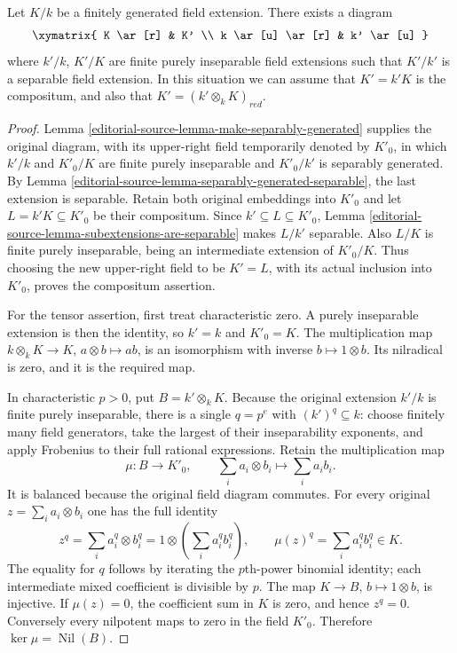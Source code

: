 \begin{lemma}
\label{editorial-source-lemma-make-separable}
Let $K/k$ be a finitely generated field extension.
There exists a diagram
$$
\xymatrix{
K \ar[r] & K' \\
k \ar[u] \ar[r] & k' \ar[u]
}
$$
where $k'/k$, $K'/K$ are finite purely inseparable field
extensions such that $K'/k'$ is a separable field extension.
In this situation we can assume that $K' = k'K$ is the compositum,
and also that $K' = (k' \otimes_k K)_{red}$.
\end{lemma}

\begin{proof}
Lemma \ref{editorial-source-lemma-make-separably-generated} supplies
the original diagram, with its upper-right field
temporarily denoted by $K'_0$, in which $k'/k$
and $K'_0/K$ are finite purely inseparable and
$K'_0/k'$ is separably generated. By Lemma
\ref{editorial-source-lemma-separably-generated-separable}, the last
extension is separable. Retain both original
embeddings into $K'_0$ and let $L=k'K\subseteq K'_0$
be their compositum. Since $k'\subseteq L\subseteq K'_0$,
Lemma \ref{editorial-source-lemma-subextensions-are-separable} makes
$L/k'$ separable. Also $L/K$ is finite purely
inseparable, being an intermediate extension of
$K'_0/K$. Thus choosing the new upper-right field
to be $K'=L$, with its actual inclusion into
$K'_0$, proves the compositum assertion.

For the tensor assertion, first treat characteristic
zero. A purely inseparable extension is then the
identity, so $k'=k$ and $K'_0=K$. The multiplication
map $k\otimes_k K\to K$, $a\otimes b\mapsto ab$,
is an isomorphism with inverse $b\mapsto1\otimes b$.
Its nilradical is zero, and it is the required map.

In characteristic $p>0$, put $B=k'\otimes_k K$.
Because the original extension $k'/k$ is finite
purely inseparable, there is a single $q=p^e$
with $(k')^q\subseteq k$: choose finitely many
field generators, take the largest of their
inseparability exponents, and apply Frobenius
to their full rational expressions. Retain
the multiplication map
$$
\mu:B\longrightarrow K'_0,\qquad
\sum_i a_i\otimes b_i\longmapsto\sum_i a_i b_i.
$$
It is balanced because the original field diagram
commutes. For every original $z=\sum_i a_i\otimes b_i$
one has the full identity
$$
z^q=\sum_i a_i^q\otimes b_i^q
=1\otimes\left(\sum_i a_i^q b_i^q\right),
\qquad
\mu(z)^q=\sum_i a_i^q b_i^q\in K.
$$
The equality for $q$ follows by iterating the
$p$th-power binomial identity; each intermediate
mixed coefficient is divisible by $p$. The map
$K\to B$, $b\mapsto1\otimes b$, is injective.
If $\mu(z)=0$, the coefficient sum in $K$ is
zero, and hence $z^q=0$. Conversely every
nilpotent maps to zero in the field $K'_0$.
Therefore $\ker\mu=\operatorname{Nil}(B)$.


\end{proof}
